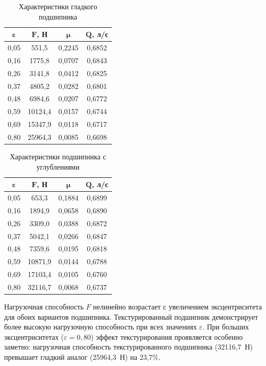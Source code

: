 \begin{table}[H]
\small
\centering
\caption{Характеристики гладкого подшипника}
\label{tab:smooth_results}
\begin{tabular}{|c|c|c|c|}
\hline
$\boldsymbol{\varepsilon}$ & $\boldsymbol{F}$\textbf{, Н} & $\boldsymbol{\mu}$ & $\boldsymbol{Q}$\textbf{, л/с} \\
\hline
0{,}05 & 551{,}5 & 0{,}2245 & 0{,}6852 \\
\hline
0{,}16 & 1775{,}8 & 0{,}0707 & 0{,}6843 \\
\hline
0{,}26 & 3141{,}8 & 0{,}0412 & 0{,}6825 \\
\hline
0{,}37 & 4805{,}2 & 0{,}0282 & 0{,}6801 \\
\hline
0{,}48 & 6984{,}6 & 0{,}0207 & 0{,}6772 \\
\hline
0{,}59 & 10124{,}4 & 0{,}0157 & 0{,}6744 \\
\hline
0{,}69 & 15347{,}9 & 0{,}0118 & 0{,}6717 \\
\hline
0{,}80 & 25964{,}3 & 0{,}0085 & 0{,}6698 \\
\hline
\end{tabular}
\end{table}

\begin{table}[H]
\small
\centering
\caption{Характеристики подшипника с \varDimpleTypeGenitive{} углублениями}
\label{tab:textured_results}
\begin{tabular}{|c|c|c|c|}
\hline
$\boldsymbol{\varepsilon}$ & $\boldsymbol{F}$\textbf{, Н} & $\boldsymbol{\mu}$ & $\boldsymbol{Q}$\textbf{, л/с} \\
\hline
0{,}05 & 653{,}3 & 0{,}1884 & 0{,}6899 \\
\hline
0{,}16 & 1894{,}9 & 0{,}0658 & 0{,}6890 \\
\hline
0{,}26 & 3309{,}0 & 0{,}0388 & 0{,}6872 \\
\hline
0{,}37 & 5042{,}1 & 0{,}0266 & 0{,}6847 \\
\hline
0{,}48 & 7359{,}6 & 0{,}0195 & 0{,}6818 \\
\hline
0{,}59 & 10871{,}9 & 0{,}0144 & 0{,}6788 \\
\hline
0{,}69 & 17103{,}4 & 0{,}0105 & 0{,}6760 \\
\hline
0{,}80 & 32116{,}7 & 0{,}0068 & 0{,}6737 \\
\hline
\end{tabular}
\end{table}

Нагрузочная способность $F$ нелинейно возрастает с увеличением эксцентриситета для обоих вариантов подшипника. Текстурированный подшипник демонстрирует более высокую нагрузочную способность при всех значениях $\varepsilon$. При больших эксцентриситетах ($\varepsilon = 0{,}80$) эффект текстурирования проявляется особенно заметно: нагрузочная способность текстурированного подшипника (32116{,}7~Н) превышает гладкий аналог (25964{,}3~Н) на 23{,}7\%.

